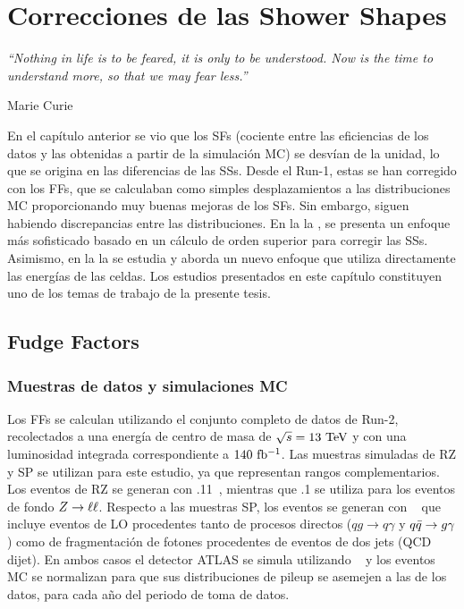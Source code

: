 \chapter{Correcciones de las Shower Shapes}
\label{ch:ss_corrections}
\epigraph{\emph{``Nothing in life is to be feared, it is only to be understood. Now is the time to understand more, so that we may fear less.”}}{Marie Curie}


En el capítulo anterior se vio que los \acp{SF} (cociente entre las eficiencias de los datos y las obtenidas a partir de la simulación \ac{MC}) se desvían de la unidad, lo que se origina en las diferencias de las \acfp{SS}. Desde el Run-1, estas se han corregido con los \acfp{FF}, que se calculaban como simples desplazamientos a las distribuciones \ac{MC} proporcionando muy buenas mejoras de los \acp{SF}. Sin embargo, siguen habiendo discrepancias entre las distribuciones.
En la la \Sect{\ref{sec:ss_corrections:ffs}}, se presenta un enfoque más sofisticado basado en un cálculo de orden superior para corregir las \acp{SS}. Asimismo, en la la \Sect{\ref{sec:ss_corrections:cell_rw}} se estudia y aborda un nuevo enfoque que utiliza directamente las energías de las celdas. Los estudios presentados en este capítulo constituyen uno de los temas de trabajo de la presente tesis.





\section{Fudge Factors}
\label{sec:ss_corrections:ffs}


\subsection{Muestras de datos y simulaciones MC}
\label{subsec:ss_corrections:ffs:samples}

Los \acp{FF} se calculan utilizando el conjunto completo de datos de Run-2, recolectados a una energía de centro de masa de \(\sqrt{s}=13~\tev\) y con una luminosidad integrada correspondiente a \(140~\ifb\).
Las muestras simuladas de \ac{RZ} y \ac{SP} se utilizan para este estudio, ya que representan rangos \pt complementarios. Los eventos de \ac{RZ} se generan con .11~\cite{Sherpa2.2}, mientras que .1 se utiliza para los eventos de fondo \(\Zboson \to \ell\ell\). Respecto a las muestras \ac{SP}, los eventos se generan con ~\cite{Pythia8.1} que incluye eventos \gammajet de \acf{LO} procedentes tanto de procesos directos (\(qg\to q\gamma\) y \(\qqbar \to g \gamma\)) como de fragmentación de fotones procedentes de eventos de dos jets (\ac{QCD} dijet).
En ambos casos el detector \ac{ATLAS} se simula utilizando \GEANT~\cite{Geant4} y los eventos \ac{MC} se normalizan para que sus distribuciones de pileup se asemejen a las de los datos, para cada año del periodo de toma de datos.


